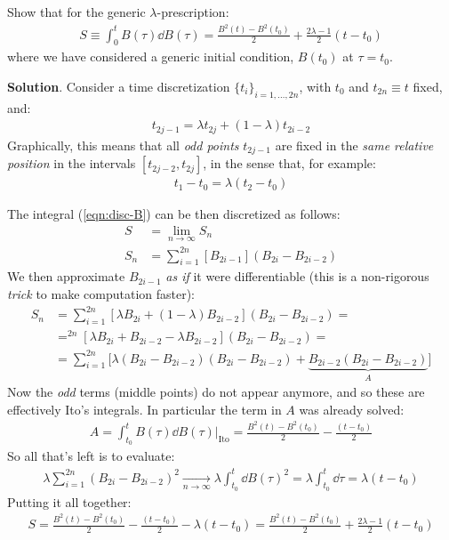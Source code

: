 \documentclass[../template.tex]{subfiles}
\begin{document}
\begin{exo}
    Show that for the generic $\lambda$-prescription:
    \begin{align}
        S\equiv \int_0^t B(\tau) \dd{B(\tau)} = \frac{B^2(t) - B^2(t_0)}{2} + \frac{2\lambda - 1}{2} (t-t_0) \label{eqn:disc-B}
    \end{align}
    where we have considered a generic initial condition, $B(t_0)$ at $\tau = t_0$.

    \medskip

    \textbf{Solution}. Consider a  time discretization $\{t_i\}_{i=1,\dots, 2n}$, with $t_0$ and $t_{2n} \equiv t$ fixed, and:
    \begin{align*}
        t_{2j-1} = \lambda t_{2j} + (1-\lambda ) t_{2i-2}
    \end{align*}
    Graphically, this means that all \textit{odd points} $t_{2j-1}$ are fixed in the \textit{same relative position} in the intervals $[t_{2j-2}, t_{2j}]$, in the sense that, for example:
    \begin{align*}
        t_1 - t_0 = \lambda(t_2 - t_0)
    \end{align*}

    The integral (\ref{eqn:disc-B}) can be then discretized as follows:
    \begin{align*}
        S &= \lim_{n \to \infty} S_n\\
        S_n &= \sum_{i=1}^{2n} [B_{2i-1}] (B_{2i} - B_{2i-2})
    \end{align*}
    We then approximate $B_{2i-1}$ \textit{as if} it were differentiable (this is a non-rigorous \textit{trick} to make computation faster):
    \begin{align*}
        S_n &= \sum_{i=1}^{2n} [\lambda B_{2i} + (1-\lambda) B_{2i-2}](B_{2i} - B_{2i-2}) =\\
        &= ^{2n} [\lambda B_{2i} +B_{2i-2}-\lambda B_{2i-2}](B_{2i} - B_{2i-2}) =\\
        &= \sum_{i=1}^{2n} \Big[\lambda(B_{2i}- B_{2i-2})(B_{2i}-B_{2i-2}) + \underbrace{B_{2i-2} (B_{2i} - B_{2i-2})}_{A} \Big]
    \end{align*}
    Now the \textit{odd} terms (middle points) do not appear anymore, and so these are effectively Ito's integrals. In particular the term in $A$ was already solved:
    \begin{align*}
        A = \int_{t_0}^t B(\tau) \dd{B(\tau)}\Big|_{\mathrm{Ito}} = \frac{B^2(t)-B^2(t_0)}{2} - \frac{(t-t_0)}{2} 
    \end{align*}
    So all that's left is to evaluate:
    \begin{align*}
        \lambda \sum_{i=1}^{2n} (B_{2i}-B_{2i-2})^2  \xrightarrow[n \to \infty]{}  \lambda \int_{t_0}^t  \dd{B(\tau)}^2 = \lambda \int_{t_0}^t \dd{\tau} = \lambda (t-t_0)
    \end{align*}
    Putting it all together:
    \begin{align*}
        S = \frac{B^2(t)-B^2(t_0)}{2} - \frac{(t-t_0)}{2} - \lambda(t-t_0) = \frac{B^2(t)-B^2(t_0)}{2} + \frac{2\lambda -1}{2}(t-t_0)  
    \end{align*}
    
\end{exo}
\end{document}
